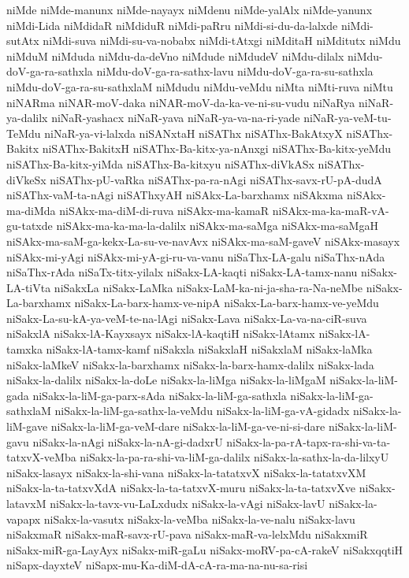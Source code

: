 {niMde
niMde-manunx
niMde-nayayx
niMdenu
niMde-yalAlx
niMde-yanunx
niMdi-Lida
niMdidaR
niMdiduR
niMdi-paRru
niMdi-si-du-da-lalxde
niMdi-sutAtx
niMdi-suva
niMdi-su-va-nobabx
niMdi-tAtxgi
niMditaH
niMditutx
niMdu
niMduM
niMduda
niMdu-da-deVno
niMdude
niMdudeV
niMdu-dilalx
niMdu-doV-ga-ra-sathxla
niMdu-doV-ga-ra-sathx-lavu
niMdu-doV-ga-ra-su-sathxla
niMdu-doV-ga-ra-su-sathxlaM
niMdudu
niMdu-veMdu
niMta
niMti-ruva
niMtu
niNARma
niNAR-moV-daka
niNAR-moV-da-ka-ve-ni-su-vudu
niNaRya
niNaR-ya-dalilx
niNaR-yashacx
niNaR-yava
niNaR-ya-va-na-ri-yade
niNaR-ya-veM-tu-TeMdu
niNaR-ya-vi-lalxda
niSANxtaH
niSAThx
niSAThx-BakAtxyX
niSAThx-Bakitx
niSAThx-BakitxH
niSAThx-Ba-kitx-ya-nAnxgi
niSAThx-Ba-kitx-yeMdu
niSAThx-Ba-kitx-yiMda
niSAThx-Ba-kitxyu
niSAThx-diVkASx
niSAThx-diVkeSx
niSAThx-pU-vaRka
niSAThx-pa-ra-nAgi
niSAThx-savx-rU-pA-dudA
niSAThx-vaM-ta-nAgi
niSAThxyAH
niSAkx-La-barxhamx
niSAkxma
niSAkx-ma-diMda
niSAkx-ma-diM-di-ruva
niSAkx-ma-kamaR
niSAkx-ma-ka-maR-vA-gu-tatxde
niSAkx-ma-ka-ma-la-dalilx
niSAkx-ma-saMga
niSAkx-ma-saMgaH
niSAkx-ma-saM-ga-kekx-La-su-ve-navAvx
niSAkx-ma-saM-gaveV
niSAkx-masayx
niSAkx-mi-yAgi
niSAkx-mi-yA-gi-ru-va-vanu
niSaThx-LA-galu
niSaThx-nAda
niSaThx-rAda
niSaTx-titx-yilalx
niSakx-LA-kaqti
niSakx-LA-tamx-nanu
niSakx-LA-tiVta
niSakxLa
niSakx-LaMka
niSakx-LaM-ka-ni-ja-sha-ra-Na-neMbe
niSakx-La-barxhamx
niSakx-La-barx-hamx-ve-nipA
niSakx-La-barx-hamx-ve-yeMdu
niSakx-La-su-kA-ya-veM-te-na-lAgi
niSakx-Lava
niSakx-La-va-na-ciR-suva
niSakxlA
niSakx-lA-Kayxsayx
niSakx-lA-kaqtiH
niSakx-lAtamx
niSakx-lA-tamxka
niSakx-lA-tamx-kamf
niSakxla
niSakxlaH
niSakxlaM
niSakx-laMka
niSakx-laMkeV
niSakx-la-barxhamx
niSakx-la-barx-hamx-dalilx
niSakx-lada
niSakx-la-dalilx
niSakx-la-doLe
niSakx-la-liMga
niSakx-la-liMgaM
niSakx-la-liM-gada
niSakx-la-liM-ga-parx-sAda
niSakx-la-liM-ga-sathxla
niSakx-la-liM-ga-sathxlaM
niSakx-la-liM-ga-sathx-la-veMdu
niSakx-la-liM-ga-vA-gidadx
niSakx-la-liM-gave
niSakx-la-liM-ga-veM-dare
niSakx-la-liM-ga-ve-ni-si-dare
niSakx-la-liM-gavu
niSakx-la-nAgi
niSakx-la-nA-gi-dadxrU
niSakx-la-pa-rA-tapx-ra-shi-va-ta-tatxvX-veMba
niSakx-la-pa-ra-shi-va-liM-ga-dalilx
niSakx-la-sathx-la-da-lilxyU
niSakx-lasayx
niSakx-la-shi-vana
niSakx-la-tatatxvX
niSakx-la-tatatxvXM
niSakx-la-ta-tatxvXdA
niSakx-la-ta-tatxvX-muru
niSakx-la-ta-tatxvXve
niSakx-latavxM
niSakx-la-tavx-vu-LaLxdudx
niSakx-la-vAgi
niSakx-lavU
niSakx-la-vapapx
niSakx-la-vasutx
niSakx-la-veMba
niSakx-la-ve-nalu
niSakx-lavu
niSakxmaR
niSakx-maR-savx-rU-pava
niSakx-maR-va-lelxMdu
niSakxmiR
niSakx-miR-ga-LayAyx
niSakx-miR-gaLu
niSakx-moRV-pa-cA-rakeV
niSakxqqtiH
niSapx-dayxteV
niSapx-mu-Ka-diM-dA-cA-ra-ma-na-nu-sa-risi
}
